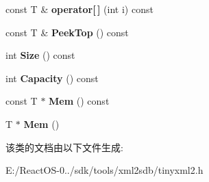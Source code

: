 \begin{DoxyCompactItemize}
const T \& {\bfseries operator\mbox{[}$\,$\mbox{]}} (int i) const
\item 
\mbox{\label{classtinyxml2_1_1_dyn_array_a5e4e1e408e646688503dec77c77c9d59}} 
const T \& {\bfseries Peek\+Top} () const
\item 
\mbox{\label{classtinyxml2_1_1_dyn_array_a67614d80847eb92cab330f1a5849a9a2}} 
int {\bfseries Size} () const
\item 
\mbox{\label{classtinyxml2_1_1_dyn_array_a8e101fdf5b4248ac119d7dca6d0f5421}} 
int {\bfseries Capacity} () const
\item 
\mbox{\label{classtinyxml2_1_1_dyn_array_a60b33e61cf10b3fd900ee46692dc0fe9}} 
const T $\ast$ {\bfseries Mem} () const
\item 
\mbox{\label{classtinyxml2_1_1_dyn_array_a2f0842cd666e2ad951f1a8bd6561fa40}} 
T $\ast$ {\bfseries Mem} ()
\end{DoxyCompactItemize}


该类的文档由以下文件生成\+:\begin{DoxyCompactItemize}
\item 
E\+:/\+React\+O\+S-\/0../sdk/tools/xml2sdb/tinyxml2.\+h\end{DoxyCompactItemize}

